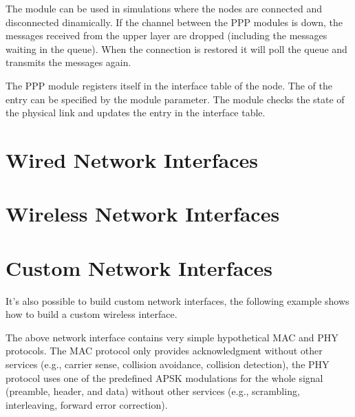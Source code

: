 The module can be used in simulations where the nodes are connected and
disconnected dinamically. If the channel between the PPP modules is down,
the messages received from the upper layer are dropped (including the messages
waiting in the queue). When the connection is restored it will
poll the queue and transmits the messages again.

The PPP module registers itself in the interface table of the node.
The  of the entry can be specified by the
 module parameter. The module checks the state of the physical link
and updates the entry in the interface table.


\section{Wired Network Interfaces}


\section{Wireless Network Interfaces}


\section{Custom Network Interfaces}

It's also possible to build custom network interfaces, the following
example shows how to build a custom wireless interface.


The above network interface contains very simple hypothetical MAC and PHY
protocols. The MAC protocol only provides acknowledgment without other
services (e.g., carrier sense, collision avoidance, collision detection),
the PHY protocol uses one of the predefined APSK modulations for the whole
signal (preamble, header, and data) without other services (e.g.,
scrambling, interleaving, forward error correction).




